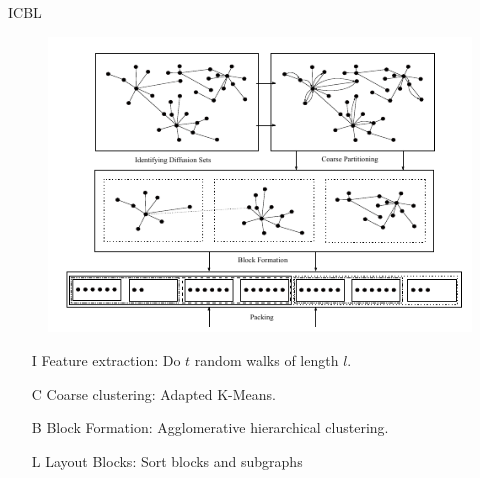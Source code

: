 \documentclass[rgb]{beamer}
\begin{document}
        \begin{frame}[allowframebreaks]{ICBL}
        \vspace{-3.3em}
            \begin{figure}
                \begin{center}
                \includegraphics[keepaspectratio, height=\textheight, width=\textwidth]{img/icbl.png}
                \end{center}
            \end{figure}
            
            \framebreak
            \begin{enumerate}
             \item[I ] Feature extraction: Do $t$ random walks of length $l$. 
             \item[C] Coarse clustering: Adapted K-Means.
             \item[B] Block Formation: Agglomerative hierarchical clustering.
             \item[L] Layout Blocks: Sort blocks and subgraphs
            \end{enumerate}

            
        \end{frame}
        
\end{document}
